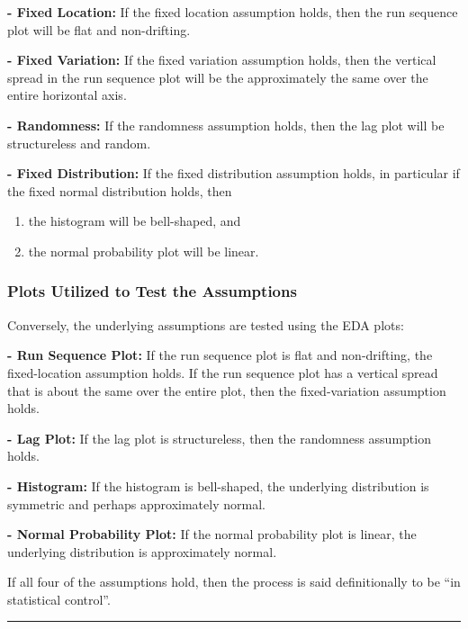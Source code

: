 \documentclass[]{book}
\providecommand{\tightlist}{%
  \setlength{\itemsep}{0pt}\setlength{\parskip}{0pt}}
\theoremstyle{definition}
\theoremstyle{definition}
\theoremstyle{definition}
\theoremstyle{remark}
\begin{document}
\textbf{- Fixed Location:} If the fixed location assumption holds, then
the run sequence plot will be flat and non-drifting.

\textbf{- Fixed Variation:} If the fixed variation assumption holds,
then the vertical spread in the run sequence plot will be the
approximately the same over the entire horizontal axis.

\textbf{- Randomness:} If the randomness assumption holds, then the lag
plot will be structureless and random.

\textbf{- Fixed Distribution:} If the fixed distribution assumption
holds, in particular if the fixed normal distribution holds, then

\begin{enumerate}
\def\labelenumi{\arabic{enumi}.}
\tightlist
\item
  the histogram will be bell-shaped, and
\item
  the normal probability plot will be linear.
\end{enumerate}

\subsubsection{Plots Utilized to Test the
Assumptions}\label{plots-utilized-to-test-the-assumptions}

Conversely, the underlying assumptions are tested using the EDA plots:

\textbf{- Run Sequence Plot:} If the run sequence plot is flat and
non-drifting, the fixed-location assumption holds. If the run sequence
plot has a vertical spread that is about the same over the entire plot,
then the fixed-variation assumption holds.

\textbf{- Lag Plot:} If the lag plot is structureless, then the
randomness assumption holds.

\textbf{- Histogram:} If the histogram is bell-shaped, the underlying
distribution is symmetric and perhaps approximately normal.

\textbf{- Normal Probability Plot:} If the normal probability plot is
linear, the underlying distribution is approximately normal.

If all four of the assumptions hold, then the process is said
definitionally to be ``in statistical control''.

\begin{center}\rule{0.5\linewidth}{\linethickness}\end{center}
\end{document}
